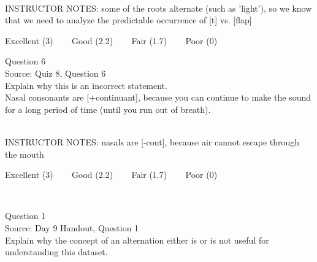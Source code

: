 \documentclass[12pt]{article}
\begin{document}
~\\
INSTRUCTOR NOTES: some of the roots alternate (such as 'light'), so we know that we need to analyze the predictable occurrence of [t] vs. [flap]


\vfill
Excellent (3) ~~~ Good (2.2) ~~~ Fair (1.7) ~~~ Poor (0)
\newpage

{\large Question 6}\\

Source: Quiz 8, Question 6\\

Explain why this is an incorrect statement.\\

Nasal consonants are {[+continuant]}, because you can continue to make the sound for a long period of time (until you run out of breath).


~\\
INSTRUCTOR NOTES: nasals are [-cont], because air cannot escape through the mouth


\vfill
Excellent (3) ~~~ Good (2.2) ~~~ Fair (1.7) ~~~ Poor (0)
\newpage

\begin{center}
\textbf{{\color{red}{\HUGE END OF EXAM}}}\\

\end{center}
\newpage

\begin{center}
\textbf{{\color{blue}{\HUGE START OF EXAM\\}}}

\textbf{{\color{blue}{\HUGE Student ID: 4090\\}}}

\textbf{{\color{blue}{\HUGE 3:00 - 3:20 PM\\}}}

\end{center}
\newpage

{\large Question 1}\\

Source: Day 9 Handout, Question 1\\

Explain why the concept of an alternation either is or is not useful for understanding this dataset.\\
\end{document}
